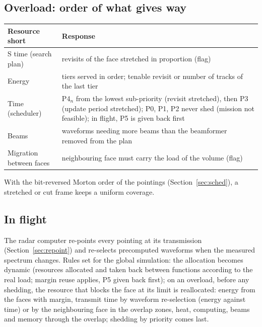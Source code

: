 \documentclass[11pt,a4paper]{article}
\begin{document}
\subsection{Overload: order of what gives way}
\begin{center}
{\small\begin{tabularx}{\linewidth}{@{}lL@{}}
\toprule
Resource short & Response\\
\midrule
S time (search plan) & revisits of the face stretched in proportion (flag)\\
Energy & tiers served in order; tenable revisit or number of tracks of the last tier\\
Time (scheduler) & P4$_n$ from the lowest sub-priority (revisit stretched), then P3 (update period stretched); P0,
P1, P2 never shed (mission not feasible); in flight, P5 is given back first\\
Beams & waveforms needing more beams than the beamformer removed from the plan\\
Migration between faces & neighbouring face must carry the load of the volume (flag)\\
\bottomrule
\end{tabularx}}
\end{center}
With the bit-reversed Morton order of the pointings (Section~\ref{sec:sched}), a stretched or cut frame keeps a uniform
coverage.

\subsection{In flight}
The radar computer re-points every pointing at its transmission (Section~\ref{sec:repoint}) and re-selects precomputed
waveforms when the measured spectrum changes. Rules set for the global simulation: the allocation becomes dynamic
(resources allocated and taken back between functions according to the real load; margin reuse applies, P5 given back
first); on an overload, before any shedding, the resource that blocks the face at its limit is reallocated: energy
from the faces with margin, transmit time by waveform re-selection (energy against time) or by the neighbouring face in
the overlap zones, heat, computing, beams and memory through the overlap; shedding by priority comes last.
\end{document}
